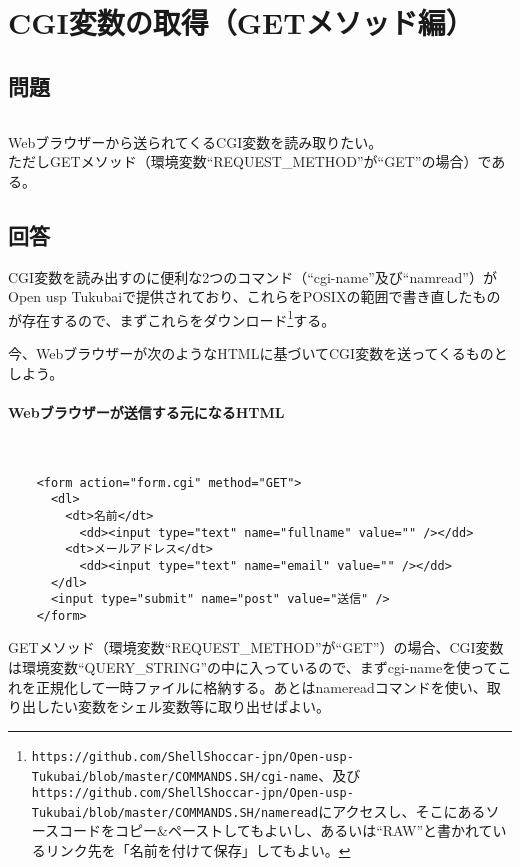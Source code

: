 \section{CGI変数の取得（GETメソッド編）}
\label{recipe:GETmethod}

\subsection*{問題}
\noindent
$\!\!\!\!\!$
\begin{grshfboxit}{160.0mm}
	Webブラウザーから送られてくるCGI変数を読み取りたい。\\
	ただしGETメソッド（環境変数``REQUEST\_{}METHOD''が``GET''の場合）である。
\end{grshfboxit}

\subsection*{回答}
CGI変数を読み出すのに便利な2つのコマンド（``cgi-name''及び``namread''）がOpen usp Tukubaiで提供されており、これらをPOSIXの範囲で書き直したものが存在するので、まずこれらをダウンロード\footnote{\verb|https://github.com/ShellShoccar-jpn/Open-usp-Tukubai/blob/master/COMMANDS.SH/cgi-name|、及び \\ \verb|https://github.com/ShellShoccar-jpn/Open-usp-Tukubai/blob/master/COMMANDS.SH/nameread|にアクセスし、そこにあるソースコードをコピー\&{}ペーストしてもよいし、あるいは``RAW''と書かれているリンク先を「名前を付けて保存」してもよい。}する。

今、Webブラウザーが次のようなHTMLに基づいてCGI変数を送ってくるものとしよう。
\paragraph{Webブラウザーが送信する元になるHTML} 　\\
\begin{frameboxit}{160.0mm}
\begin{verbatim}
	<form action="form.cgi" method="GET">
	  <dl>
	    <dt>名前</dt>
	      <dd><input type="text" name="fullname" value="" /></dd>
	    <dt>メールアドレス</dt>
	      <dd><input type="text" name="email" value="" /></dd>
	  </dl>
	  <input type="submit" name="post" value="送信" />
	</form>
\end{verbatim}
\end{frameboxit}

GETメソッド（環境変数``REQUEST\_{}METHOD''が``GET''）の場合、CGI変数は環境変数``QUERY\_{}STRING''の中に入っているので、まずcgi-nameを使ってこれを正規化して一時ファイルに格納する。あとはnamereadコマンドを使い、取り出したい変数をシェル変数等に取り出せばよい。


